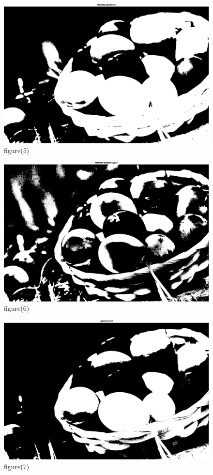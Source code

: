 \documentclass[10pt,a4paper,twoside]{article}%
\begin{document}
\begin{figure}[H]
    \centering
    \includegraphics[width=1\linewidth]{kod matlab/myVectorFile5.pdf}
\caption{figure(5)}
    \label{fig:obr1}
\end{figure}

\begin{figure}[H]
    \centering
    \includegraphics[width=1\linewidth]{kod matlab/myVectorFile6.pdf}
\caption{figure(6)}
    \label{fig:obr1}
\end{figure}

\begin{figure}[H]
    \centering
    \includegraphics[width=1\linewidth]{kod matlab/myVectorFile7.pdf}
\caption{figure(7)}
    \label{fig:obr1}
\end{figure}
\end{document}
